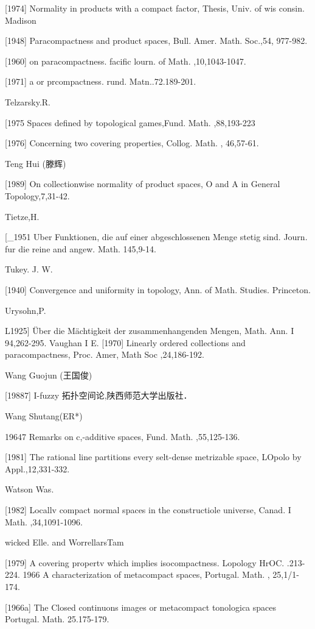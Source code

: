 \documentclass[main.tex]{subfiles}
\begin{document}
{[1974]
Normality in products with a compact factor, Thesis, Univ. of wis
consin. Madison

[1948]
Paracompactness and product spaces, Bull. Amer. Math. Soc.,54,
977-982.

[1960]
on paracompactness. facific lourn.
of Math. ,10,1043-1047.

[1971]
a or prcompactness. rund. Matn..72.189-201.

\noindent Telzarsky.R.

[1975 Spaces defined by topological games,Fund. Math. ,88,193-223

[1976]
Concerning two covering properties, Collog. Math. , 46,57-61.

\noindent Teng Hui (滕辉)

[1989]
On collectionwise normality of product spaces, O and A in General
Topology,7,31-42.

Tietze,H.

[_1951 Uber Funktionen, die auf einer abgeschlossenen Menge stetig sind.
Journ. fur die reine and angew. Math. 145,9-14.

Tukey. J. W.

[1940]
Convergence and uniformity in topology, Ann. of Math. Studies.
Princeton.

\noindent Urysohn,P.

L1925] Über die Mächtigkeit der zusammenhangenden Mengen, Math. Ann. I
94,262-295.
Vaughan I E.
[1970] Linearly ordered collections and paracompactness, Proc. Amer, Math
Soc
,24,186-192.

\noindent Wang Guojun (王国俊)

[19887] I-fuzzy 拓扑空间论,陕西师范大学出版社．

\noindent Wang Shutang(ER*)

	19647 Remarks on c,-additive spaces, Fund. Math. ,55,125-136.
	
	[1981]
	The rational line partitions every selt-dense metrizable space, LOpolo
	by
	Appl.,12,331-332.

\noindent Watson Was.
	
	[1982]
	Locallv compact normal spaces in the constructiole universe, Canad.
	I Math.
	,34,1091-1096.

\noindent 	wicked Elle. and WorrellarsTam

	[1979]
	A covering propertv which implies isocompactness. Lopology HrOC.
	.213-224.
	1966 A characterization of metacompact spaces, Portugal. Math. , 25,1/1-
	174.

	[1966a]
	The Closed
	continuons images or metacompact
	tonologica spaces
	Portugal.
	Math. 25.175-179.

}
\end{document}
